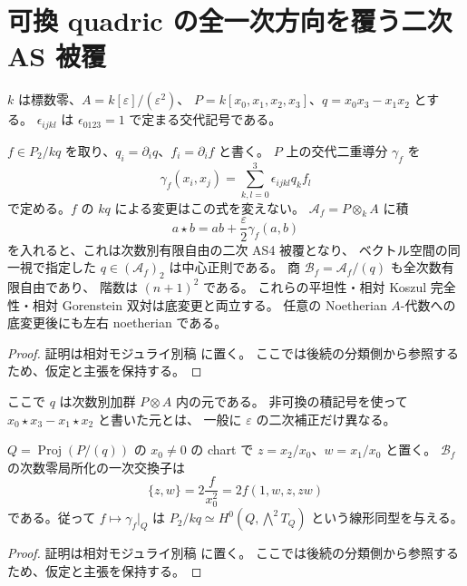 \section{可換 quadric の全一次方向を覆う二次 AS 被覆}
\label{sec:quadric-first-order-as}

$k$ は標数零、$A=k[\varepsilon]/(\varepsilon^2)$、
$P=k[x_0,x_1,x_2,x_3]$、$q=x_0x_3-x_1x_2$ とする。
$\epsilon_{ijkl}$ は $\epsilon_{0123}=1$ で定まる交代記号である。

\begin{proposition}
\label{prop:quadric-first-order-jacobian-cover}
$f\in P_2/kq$ を取り、$q_i=\partial_iq$、$f_i=\partial_if$ と書く。
$P$ 上の交代二重導分 $\gamma_f$ を
\[
 \gamma_f(x_i,x_j)=\sum_{k,l=0}^3\epsilon_{ijkl}q_kf_l
\]
で定める。$f$ の $kq$ による変更はこの式を変えない。
$\mathcal A_f=P\otimes_kA$ に積
\[
 a\star b=ab+\frac{\varepsilon}{2}\gamma_f(a,b)
\]
を入れると、これは次数別有限自由の二次 AS4 被覆となり、
ベクトル空間の同一視で指定した $q\in(\mathcal A_f)_2$ は中心正則である。
商 $\mathcal B_f=\mathcal A_f/(q)$ も全次数有限自由であり、
階数は $(n+1)^2$ である。
これらの平坦性・相対 Koszul 完全性・相対 Gorenstein 双対は底変更と両立する。
任意の Noetherian $A$-代数への底変更後にも左右 noetherian である。
\end{proposition}
\begin{proof}
証明は相対モジュライ別稿 \cite[\texttt{quadric_first_order} 節]{QuadricModuli2026} に置く。
ここでは後続の分類側から参照するため、仮定と主張を保持する。
\end{proof}

ここで $q$ は次数別加群 $P\otimes A$ 内の元である。
非可換の積記号を使って $x_0\star x_3-x_1\star x_2$ と書いた元とは、
一般に $\varepsilon$ の二次補正だけ異なる。

\begin{lemma}
\label{lem:quadric-jacobian-bivectors}
$Q=\operatorname{Proj}(P/(q))$ の $x_0\ne0$ の chart で
$z=x_2/x_0$、$w=x_1/x_0$ と置く。
$\mathcal B_f$ の次数零局所化の一次交換子は
\[
 \{z,w\}=2\frac{f}{x_0^2}
        =2f(1,w,z,zw)
\]
である。従って $f\mapsto\gamma_f|_Q$ は
$P_2/kq\simeq H^0(Q,\bigwedge^2T_Q)$ という線形同型を与える。
\end{lemma}
\begin{proof}
証明は相対モジュライ別稿 \cite[\texttt{quadric_first_order} 節]{QuadricModuli2026} に置く。
ここでは後続の分類側から参照するため、仮定と主張を保持する。
\end{proof}

